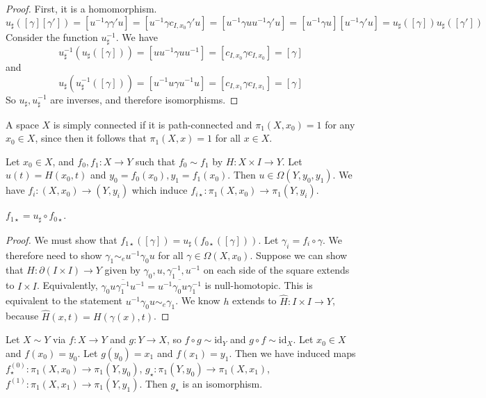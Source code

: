 \begin{proof}
	First, it is a homomorphism.
	\[ u_\sharp([\gamma][\gamma']) = [u^{-1}\gamma \gamma' u] = [u^{-1}\gamma c_{I,x_0}\gamma' u] = [u^{-1}\gamma u u^{-1} \gamma' u] = [u^{-1}\gamma u][u^{-1}\gamma' u] = u_\sharp([\gamma])u_\sharp([\gamma']) \]
	Consider the function \( u^{-1}_\sharp \).
	We have
	\[ u^{-1}_\sharp(u_\sharp([\gamma])) = [uu^{-1}\gamma uu^{-1}] = [c_{I,x_0} \gamma c_{I,x_0}] = [\gamma] \]
	and
	\[ u_\sharp(u^{-1}_\sharp([\gamma])) = [u^{-1}u\gamma u^{-1}u] = [c_{I,x_1} \gamma c_{I,x_1}] = [\gamma] \]
	So \( u_\sharp, u^{-1}_\sharp \) are inverses, and therefore isomorphisms.
\end{proof}
\begin{corollary}
	A space \( X \) is simply connected if it is path-connected and \( \pi_1(X,x_0) = 1 \) for any \( x_0 \in X \), since then it follows that \( \pi_1(X,x) = 1 \) for all \( x \in X \).
\end{corollary}
Let \( x_0 \in X \), and \( f_0, f_1 \colon X \to Y \) such that \( f_0 \sim f_1 \) by \( H \colon X \times I \to Y \).
Let \( u(t) = H(x_0,t) \) and \( y_0 = f_0(x_0), y_1 = f_1(x_0) \).
Then \( u \in \Omega(Y,y_0,y_1) \).
We have \( f_i \colon (X,x_0) \to (Y,y_i) \) which induce \( f_{i\star} \colon \pi_1(X,x_0) \to \pi_1(Y,y_i) \).
\begin{theorem}
	\( f_{1\star} = u_\sharp \circ f_{0\star} \).
\end{theorem}
\begin{proof}
	We must show that \( f_{1\star}([\gamma]) = u_\sharp(f_{0\star}([\gamma])) \).
	Let \( \gamma_i = f_i \circ \gamma \).
	We therefore need to show \( \gamma_1 \sim_e u^{-1} \gamma_0 u \) for all \( \gamma \in \Omega(X,x_0) \).
	Suppose we can show that \( H \colon \partial (I \times I) \to Y \) given by \( \gamma_0, u, \gamma_1^{-1}, u^{-1} \) on each side of the square extends to \( I \times I \).
	Equivalently, \( \overline{\gamma_0 u \gamma_1^{-1} u^{-1}} = \overline{u^{-1}\gamma_0 u \gamma_1^{-1}} \) is null-homotopic.
	This is equivalent to the statement \( u^{-1}\gamma_0 u \sim_e \gamma_1 \).
	We know \( h \) extends to \( \hat H \colon I \times I \to Y \), because \( \hat H(x,t) = H(\gamma(x),t) \).
\end{proof}
\begin{corollary}
	Let \( X \sim Y \) via \( f : X \to Y \) and \( g \colon Y \to X \), so \( f \circ g \sim \mathrm{id}_Y \) and \( g \circ f \sim \mathrm{id}_X \).
	Let \( x_0 \in X \) and \( f(x_0) = y_0 \).
	Let \( g(y_0) = x_1 \) and \( f(x_1) = y_1 \).
	Then we have induced maps \( f^{(0)}_\star \colon \pi_1(X,x_0) \to \pi_1(Y,y_0) \), \( g_\star \colon \pi_1(Y,y_0) \to \pi_1(X,x_1) \), \( f^{(1)} \colon \pi_1(X,x_1) \to \pi_1(Y,y_1) \).
	Then \( g_\star \) is an isomorphism.
\end{corollary}
